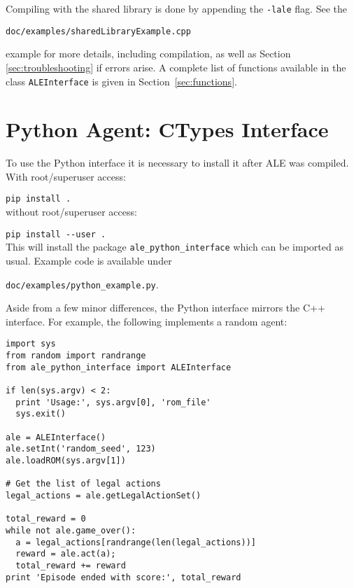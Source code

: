 \documentclass[12pt]{article}
\begin{document}
Compiling with the shared library is done by appending the \verb+-lale+ flag. 
See the 

\begin{center} \verb+doc/examples/sharedLibraryExample.cpp+\end{center}

\noindent example for more details, including compilation, as
well as Section \ref{sec:troubleshooting} if errors arise.
A complete list of functions available in the class \verb+ALEInterface+ is given in Section~\ref{sec:functions}.

\section{Python Agent: CTypes Interface}\label{sec:python_interface}

To use the Python interface it is necessary to install it after ALE was compiled. With root/superuser access:

\verb+pip install .+\\

\noindent without root/superuser access:

\verb+pip install --user .+\\

This will install the package \verb+ale_python_interface+ which can be imported as usual. Example code is available under 
\begin{center} \verb+doc/examples/python_example.py+. \end{center}

Aside from a few minor differences, the Python interface mirrors the C++ interface. For example, the following implements a random agent: 

\begin{verbatim}
import sys
from random import randrange
from ale_python_interface import ALEInterface

if len(sys.argv) < 2:
  print 'Usage:', sys.argv[0], 'rom_file'
  sys.exit()

ale = ALEInterface()
ale.setInt('random_seed', 123)
ale.loadROM(sys.argv[1])

# Get the list of legal actions
legal_actions = ale.getLegalActionSet()

total_reward = 0
while not ale.game_over():
  a = legal_actions[randrange(len(legal_actions))]
  reward = ale.act(a);
  total_reward += reward
print 'Episode ended with score:', total_reward
\end{verbatim}
\end{document}
